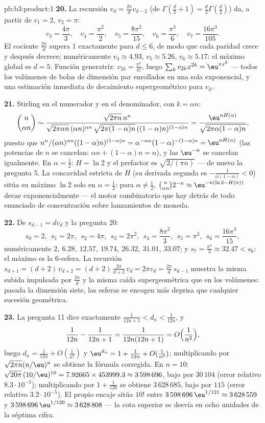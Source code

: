 \begin{solution}{pb:b3:product:1}
\textbf{20.} La recursión $v_d = \frac{2\pi}dv_{d-2}$ (de
$\Gamma(\frac d2 + 1) = \frac d2\Gamma(\frac d2)$) da, a partir de
$v_1 = 2$, $v_2 = \pi$:
\[
v_3 = \frac{4\pi}3,\quad v_4 = \frac{\pi^2}2,\quad
v_5 = \frac{8\pi^2}{15},\quad v_6 = \frac{\pi^3}6,\quad
v_7 = \frac{16\pi^3}{105}.
\]
El cociente $\frac{2\pi}d$ supera $1$ exactamente para $d \leq 6$, de
modo que cada paridad crece y después decrece; numéricamente $v_4
\approx 4.93$, $v_5 \approx 5.26$, $v_6 \approx 5.17$: el máximo global
es $d = 5$. Función generatriz: $v_{2k} =
\frac{\pi^k}{k!}$, luego $\sum_kv_{2k}x^{2k} =
\eu^{\pi x^2}$ --- todos los volúmenes de bolas de dimensión par
enrollados en una sola exponencial, y una estimación inmediata de
decaimiento supergeométrico para $v_d$.

\textbf{21.} Stirling en el numerador y en el denominador, con $k =
\alpha n$:
\[
\binom n{\alpha n} \sim
\frac{\sqrt{2\pi n}\,n^n}
{\sqrt{2\pi\alpha n}\,(\alpha n)^{\alpha n}\,
\sqrt{2\pi(1-\alpha)n}\,((1-\alpha)n)^{(1-\alpha)n}}
= \frac{\eu^{nH(\alpha)}}{\sqrt{2\pi\alpha(1-\alpha)n}},
\]
puesto que $n^n/(\alpha n)^{\alpha n}((1-\alpha)n)^{(1-\alpha)n} =
\alpha^{-\alpha n}(1-\alpha)^{-(1-\alpha)n} =
\eu^{nH(\alpha)}$ (las potencias de $n$ se cancelan: $\alpha n +
(1-\alpha)n = n$), y las $\eu^{-n}$ se cancelan igualmente. En
$\alpha = \frac12$: $H = \ln2$ y el prefactor es $\sqrt{2/(\pi n)}$ ---
de nuevo la pregunta 5. La concavidad estricta de $H$ (su derivada
segunda es $-\frac1{\alpha(1-\alpha)} < 0$) sitúa su máximo $\ln 2$ solo
en $\alpha = \frac12$: para $\alpha \neq \frac12$,
$\binom n{\alpha n}2^{-n} \approx
\eu^{-n(\ln2 - H(\alpha))}$ decae exponencialmente --- el motor
combinatorio que hay detrás de todo enunciado de concentración sobre
lanzamientos de moneda.

\textbf{22.} De $s_{d-1} = dv_d$ y la pregunta 20:
\[
s_0 = 2,\ \ s_1 = 2\pi,\ \ s_2 = 4\pi,\ \ s_3 = 2\pi^2,\ \
s_4 = \frac{8\pi^2}3,\ \ s_5 = \pi^3,\ \ s_6 =
\frac{16\pi^3}{15},
\]
numéricamente $2,\ 6.28,\ 12.57,\ 19.74,\ 26.32,\ 31.01,\
33.07$; y $s_7 = \frac{\pi^4}3 \approx 32.47 < s_6$: el máximo es la
$6$-esfera. La recursión $s_{d+1} =
(d+2)\,v_{d+2} = (d+2)\,\frac{2\pi}{d+2}\,v_d = 2\pi v_d =
\frac{2\pi}d\,s_{d-1}$ muestra la misma subida impulsada por
$\frac{2\pi}d$ y la misma caída supergeométrica que en los volúmenes:
pasada la dimensión siete, las esferas se encogen más deprisa que
cualquier sucesión geométrica.

\textbf{23.} La pregunta 11 dice exactamente $\frac1{12n+1} < d_n <
\frac1{12n}$, y
\[
\frac1{12n} - \frac1{12n+1} = \frac1{12n(12n+1)} =
O\Bigl(\frac1{n^2}\Bigr),
\]
luego $d_n = \frac1{12n} + O(\frac1{n^2})$ y $\eu^{d_n} = 1 +
\frac1{12n} + O(\frac1{n^2})$; multiplicando por
$\sqrt{2\pi n}(n/\eu)^n$ se obtiene la fórmula corregida. En $n =
10$: $\sqrt{20\pi}\,(10/\eu)^{10} = 7.92665 \times 453999.3
\approx 3\,598\,696$, bajo por $30\,104$ (error relativo
$8.3\cdot10^{-3}$); multiplicando por $1 + \frac1{120}$ se obtiene
$3\,628\,685$, bajo por $115$ (error relativo $3.2\cdot10^{-5}$). El
propio encaje sitúa $10!$ entre
$3\,598\,696\,\eu^{1/121} \approx 3\,628\,559$ y
$3\,598\,696\,\eu^{1/120} \approx 3\,628\,808$ --- la cota superior se
desvía en ocho unidades de la séptima cifra.


\end{solution}
